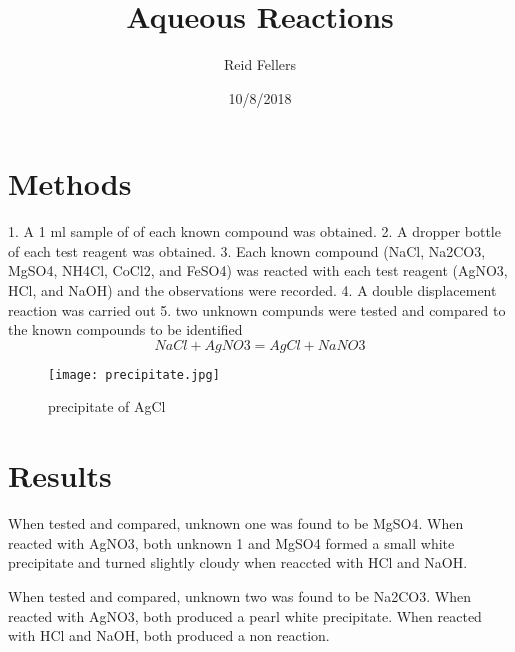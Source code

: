 \documentclass[12pt]{article}
\begin{document}
\title{Aqueous Reactions}
\author{Reid Fellers}
\date{10/8/2018}
\maketitle

\section{Methods}
\label{sec:methods}

1. A 1 ml sample of of each known compound was obtained.
2. A dropper bottle of each test reagent was obtained.
3. Each known compound (NaCl, Na2CO3, MgSO4, NH4Cl, CoCl2, and FeSO4) was reacted with each test reagent (AgNO3, HCl, and NaOH) and the observations were recorded.
4. A double displacement reaction was carried out
5. two unknown compunds were tested and compared to the known compounds to be identified
\begin {equation}
 \label {eq:1}
 NaCl + AgNO3 = AgCl + NaNO3
 \end {equation}
 \begin {figure}[ht]
   \centering
   \texttt{[image: precipitate.jpg]}
   \caption{precipitate of AgCl}
   \label{fig : AgCl precipitate}
   \end{figure}
\section{Results}
\label{sec:results}
When tested and compared, unknown one was found to be MgSO4. When reacted with AgNO3, both unknown 1 and MgSO4 formed a small white precipitate and turned slightly cloudy when reaccted with HCl and NaOH.

When tested and compared, unknown two was found to be Na2CO3. When reacted with AgNO3, both produced a pearl white precipitate. When reacted with HCl and NaOH, both produced a non reaction.
\end{document}
